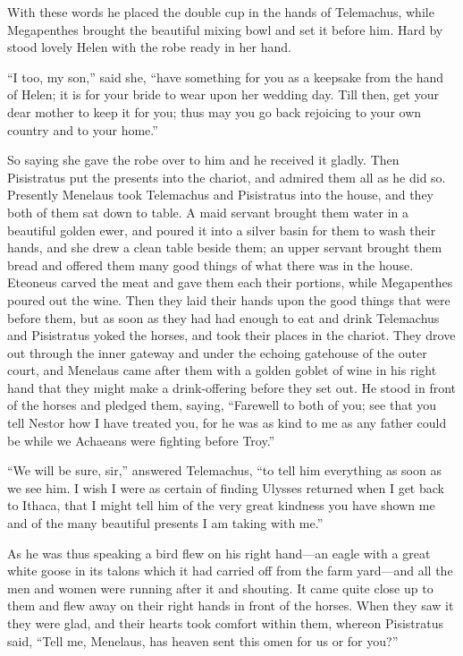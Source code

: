With these words he placed the double cup in the hands of Telemachus, while
Megapenthes brought the beautiful mixing bowl and set it before him. Hard by
stood lovely Helen with the robe ready in her hand.

“I too, my son,” said she, “have something for you as a keepsake from the hand
of Helen; it is for your bride to wear upon her wedding day. Till then, get
your dear mother to keep it for you; thus may you go back rejoicing to your own
country and to your home.”

So saying she gave the robe over to him and he received it gladly. Then
Pisistratus put the presents into the chariot, and admired them all as he did
so. Presently Menelaus took Telemachus and Pisistratus into the house, and they
both of them sat down to table. A maid servant brought them water in a
beautiful golden ewer, and poured it into a silver basin for them to wash their
hands, and she drew a clean table beside them; an upper servant brought them
bread and offered them many good things of what there was in the house.
Eteoneus carved the meat and gave them each their portions, while Megapenthes
poured out the wine. Then they laid their hands upon the good things that were
before them, but as soon as they had had enough to eat and drink Telemachus and
Pisistratus yoked the horses, and took their places in the chariot. They drove
out through the inner gateway and under the echoing gatehouse of the outer
court, and Menelaus came after them with a golden goblet of wine in his right
hand that they might make a drink-offering before they set out. He stood in
front of the horses and pledged them, saying, “Farewell to both of you; see
that you tell Nestor how I have treated you, for he was as kind to me as any
father could be while we Achaeans were fighting before Troy.”

“We will be sure, sir,” answered Telemachus, “to tell him everything as soon as
we see him. I wish I were as certain of finding Ulysses returned when I get
back to Ithaca, that I might tell him of the very great kindness you have shown
me and of the many beautiful presents I am taking with me.”

As he was thus speaking a bird flew on his right hand—an eagle with a great
white goose in its talons which it had carried off from the farm yard—and all
the men and women were running after it and shouting. It came quite close up to
them and flew away on their right hands in front of the horses. When they saw
it they were glad, and their hearts took comfort within them, whereon
Pisistratus said, “Tell me, Menelaus, has heaven sent this omen for us or for
you?”

